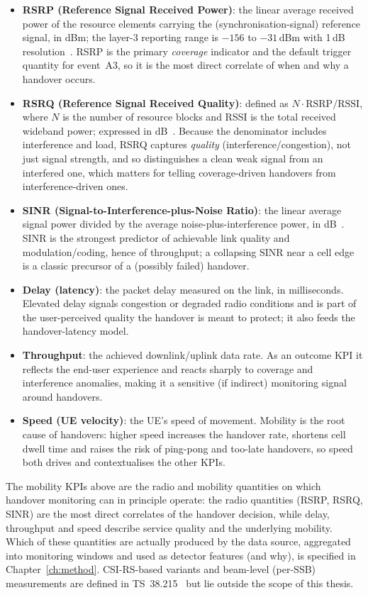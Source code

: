 \begin{itemize}
  \item \textbf{RSRP (Reference Signal Received Power)}: the linear average
  received power of the resource elements carrying the (synchronisation-signal)
  reference signal, in dBm; the layer-3 reporting range is
  $-156$ to $-31$\,dBm with 1\,dB resolution~\cite{ts38215,ts38133}. RSRP is the primary
  \emph{coverage} indicator and the default trigger quantity for event~A3, so it
  is the most direct correlate of when and why a handover occurs.
  \item \textbf{RSRQ (Reference Signal Received Quality)}: defined as
  $N\cdot\mathrm{RSRP}/\mathrm{RSSI}$, where $N$ is the number of resource blocks
  and RSSI is the total received wideband power; expressed in dB~\cite{ts38215}.
  Because the denominator includes interference and load, RSRQ captures
  \emph{quality} (interference/congestion), not just signal strength, and so
  distinguishes a clean weak signal from an interfered one, which matters for
  telling coverage-driven handovers from interference-driven ones.
  \item \textbf{SINR (Signal-to-Interference-plus-Noise Ratio)}: the linear
  average signal power divided by the average noise-plus-interference power, in
  dB~\cite{ts38215}. SINR is the strongest predictor of achievable link quality
  and modulation/coding, hence of throughput; a collapsing SINR near a cell edge
  is a classic precursor of a (possibly failed) handover.
  \item \textbf{Delay (latency)}: the packet delay measured on the link, in
  milliseconds. Elevated delay signals congestion or degraded radio conditions
  and is part of the user-perceived quality the handover is meant to protect; it
  also feeds the handover-latency model.
  \item \textbf{Throughput}: the achieved downlink/uplink data rate. As an
  outcome KPI it reflects the end-user experience and reacts sharply to coverage
  and interference anomalies, making it a sensitive (if indirect) monitoring
  signal around handovers.
  \item \textbf{Speed (UE velocity)}: the UE's speed of movement. Mobility is
  the root cause of handovers: higher speed increases the handover rate, shortens
  cell dwell time and raises the risk of ping-pong and too-late handovers, so
  speed both drives and contextualises the other KPIs.
\end{itemize}
The mobility KPIs above are the radio and mobility quantities on which handover
monitoring can in principle operate: the radio quantities (RSRP, RSRQ, SINR) are
the most direct correlates of the handover decision, while delay, throughput and
speed describe service quality and the underlying mobility. Which of these
quantities are actually produced by the data source, aggregated into monitoring
windows and used as detector features (and why), is specified in
Chapter~\ref{ch:method}. CSI-RS-based variants and beam-level (per-SSB)
measurements are defined in TS~38.215~\cite{ts38215} but lie outside the scope of
this thesis.

